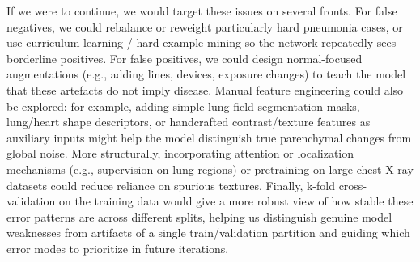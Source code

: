 \documentclass[11pt]{article}
\begin{document}
If we were to continue, we would target these issues on several fronts. For false negatives, we could rebalance or reweight particularly hard pneumonia cases, or use curriculum learning / hard-example mining so the network repeatedly sees borderline positives. For false positives, we could design normal-focused augmentations (e.g., adding lines, devices, exposure changes) to teach the model that these artefacts do not imply disease. Manual feature engineering could also be explored: for example, adding simple lung-field segmentation masks, lung/heart shape descriptors, or handcrafted contrast/texture features as auxiliary inputs might help the model distinguish true parenchymal changes from global noise. More structurally, incorporating attention or localization mechanisms (e.g., supervision on lung regions) or pretraining on large chest-X-ray datasets could reduce reliance on spurious textures. Finally, k-fold cross-validation on the training data would give a more robust view of how stable these error patterns are across different splits, helping us distinguish genuine model weaknesses from artifacts of a single train/validation partition and guiding which error modes to prioritize in future iterations.




\end{document}
